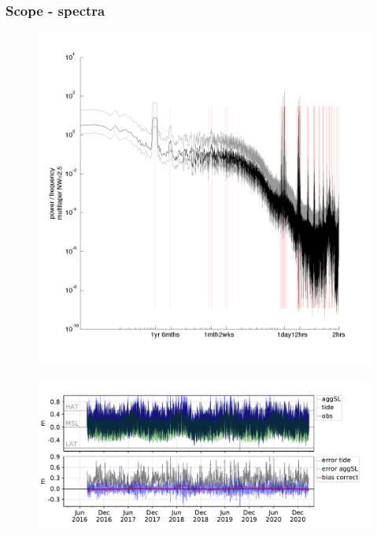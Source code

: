 \begin{frame}
\frametitle{Scope - spectra}
\begin{minipage}{0.45\textwidth}
    \begin{figure}      
    \includegraphics[width=\textwidth]{figures/plots/spectra_109504.png}
    \end{figure}
\end{minipage}
\hfill
\begin{minipage}{0.45\textwidth}
    \begin{figure}      
     \includegraphics[width=\textwidth]{figures/plots/586204_verify_ts.pdf}
    \end{figure} 
\end{minipage}
\end{frame}
